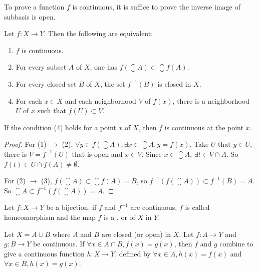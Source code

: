 To prove a function $f$ is continuous, it is suffice to prove the inverse image of subbasis is open.

\begin{theorem}
Let $f: X \rightarrow Y$. Then the following are equivalent:
\begin{enumerate}
    \item $f$ is continuous.
    \item For every subset $A$ of $X$, one has $f(\closure{A}) \subset \closure{f(A)}$.
    \item For every closed set $B$ of $X$, the set $f^{-1}(B)$ is closed in $X$.
    \item For each $x\in X$ and each neighborhood $V$ of $f(x)$, there is a neighborhood $U$ of $x$ such that $f(U) \subset V$.
\end{enumerate}    

If the condition (4) holds for a point $x$ of $X$, then $f$ is continuous at the point $x$.
\end{theorem}
\begin{proof}
    For (1) $\rightarrow$ (2), $\forall y \in f(\closure{A}), \exists x \in \closure{A}, y = f(x)$. Take $U$ that $y \in U$, there is $V = f^{-1}(U)$ that is open and $x \in V$. Since $x \in \closure{A}$, $\exists t \in V \cap A$. So $f(t) \in U \cap f(A) \neq \emptyset$.
    
    For (2) $\rightarrow$ (3), $f(\closure{A}) \subset \closure{f(A)} = B$, so $f^{-1} \left(f(\closure{A}) \right) \subset f^{-1}(B) = A$. So $\closure{A} \subset f^{-1} \left(f(\closure{A}) \right) = A$.
\end{proof}


\begin{definition}
    Let $f:X \rightarrow Y$ be a bijection. if $f$ and $f^{-1}$ are continuous, $f$ is called homeomorphism and the map $f$ is a , or  of $X$ in $Y$.
\end{definition}


\begin{theorem}
    Let $X = A \cup B$ where $A$ and $B$ are closed (or open) in $X$. Let $f: A \rightarrow Y$ and $g: B \rightarrow Y$ be continuous. If $\forall x \in A \cap B, f(x) = g(x)$, then $f$ and $g$ combine to give a continuous function $h: X \rightarrow Y$, defined by $\forall x \in A, h(x) = f(x) $ and $\forall x \in B , h(x) = g(x)$.
\end{theorem}

